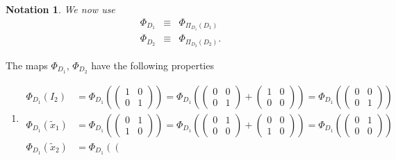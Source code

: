 \documentclass[aps,preprint]{revtex4}
\newtheorem{notation}[theorem]{Notation}
\begin{document}
\begin{notation}
We now use 
\begin{eqnarray}
\Phi _{D_{1}} &\equiv &\Phi _{\mathcal{\Pi }_{D_{1}}\left( D_{1}\right) } \\
\Phi _{D_{2}} &\equiv &\Phi _{\mathcal{\Pi }_{D_{2}}\left( D_{2}\right) }.
\end{eqnarray}
\end{notation}

The maps $\Phi _{D_{1}}$, $\Phi _{D_{2}}$ have the following properties

\begin{enumerate}
\item 
\begin{align}
\Phi _{D_{1}}\left( I_{2}\right) & =\Phi _{D_{1}}\left( \left( 
\begin{array}{cc}
1 & 0 \\ 
0 & 1%
\end{array}%
\right) \right) =\Phi _{D_{1}}\left( \left( 
\begin{array}{cc}
0 & 0 \\ 
0 & 1%
\end{array}%
\right) +\left( 
\begin{array}{cc}
1 & 0 \\ 
0 & 0%
\end{array}%
\right) \right) =\Phi _{D_{1}}\left( \left( 
\begin{array}{cc}
0 & 0 \\ 
0 & 1%
\end{array}%
\right) \right) \\
\Phi _{D_{1}}\left( \widetilde{x}_{1}\right) & =\Phi _{D_{1}}\left( \left( 
\begin{array}{cc}
0 & 1 \\ 
1 & 0%
\end{array}%
\right) \right) =\Phi _{D_{1}}\left( \left( 
\begin{array}{cc}
0 & 1 \\ 
0 & 0%
\end{array}%
\right) +\left( 
\begin{array}{cc}
0 & 0 \\ 
1 & 0%
\end{array}%
\right) \right) =\Phi _{D_{1}}\left( \left( 
\begin{array}{cc}
0 & 1 \\ 
0 & 0%
\end{array}%
\right) \right) \\
\Phi _{D_{1}}\left( \widetilde{x}_{2}\right) & =\Phi _{D_{1}}\left( \left( 

\end{align}
\end{enumerate}
\end{document}
